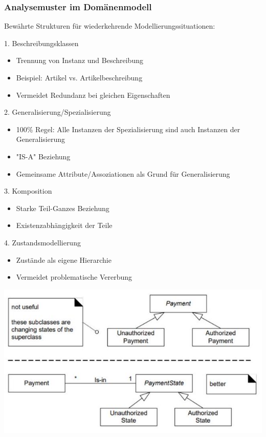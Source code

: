 \subsubsection{Analysemuster im Domänenmodell}
Bewährte Strukturen für wiederkehrende Modellierungssituationen:

\begin{concept}{1. Beschreibungsklassen}
\begin{itemize}
    \item Trennung von Instanz und Beschreibung
    \item Beispiel: Artikel vs. Artikelbeschreibung
    \item Vermeidet Redundanz bei gleichen Eigenschaften
\end{itemize}
\end{concept}

\begin{concept}{2. Generalisierung/Spezialisierung}
\begin{itemize}
    \item 100\% Regel: Alle Instanzen der Spezialisierung sind auch Instanzen der Generalisierung
    \item "IS-A" Beziehung
    \item Gemeinsame Attribute/Assoziationen als Grund für Generalisierung
\end{itemize}
\end{concept}

\begin{concept}{3. Komposition}
\begin{itemize}
    \item Starke Teil-Ganzes Beziehung
    \item Existenzabhängigkeit der Teile
\end{itemize}
\end{concept}

\begin{concept}{4. Zustandsmodellierung}
\begin{itemize}
    \item Zustände als eigene Hierarchie
    \item Vermeidet problematische Vererbung
\end{itemize}
\includegraphics[width=0.9\linewidth]{images/2024_12_29_0d1d7b5551ea1b4b41bdg-07(1)}
\end{concept}

